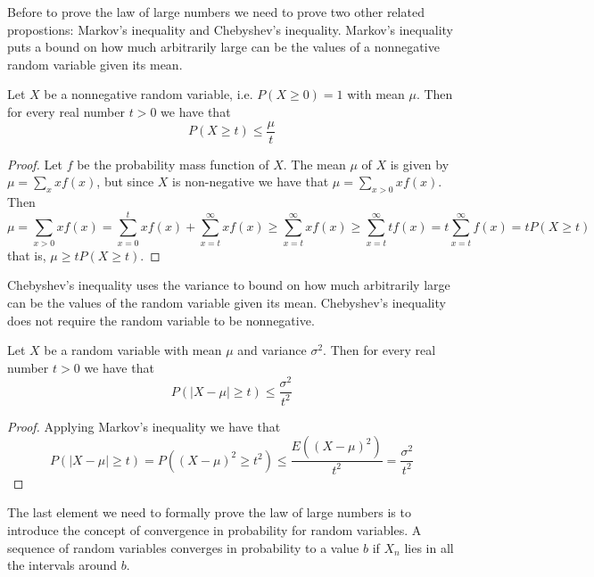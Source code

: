 Before to prove the law of large numbers we need to prove two other related propostions: Markov's inequality and Chebyshev's inequality. Markov's inequality puts a bound on how much arbitrarily large can be the values of a nonnegative random variable given its mean. 

\begin{proposition}
Let $X$ be a nonnegative random variable, i.e. $P\left( X \geq 0 \right) = 1$ with mean $\mu$. Then for every real number $t>0$ we have that 
\[
P \left( X \geq t \right) \leq \frac{\mu}{t}
\]
\end{proposition}
\begin{proof}
Let $f$ be the probability mass function of $X$. The mean $\mu$ of $X$ is given by $\mu = \sum_{x} x f \left( x \right)$, but since $X$ is non-negative we have that $\mu = \sum_{x>0} x f \left( x \right)$. Then
\[
\mu = \sum_{x>0} x f \left( x \right) = \sum_{x=0}^{t} x f \left( x \right) + \sum_{x=t}^{\infty} x f \left( x \right) \geq
\sum_{x=t}^{\infty} x f \left( x \right) \geq \sum_{x=t}^{\infty} t f \left( x \right) = t \sum_{x=t}^{\infty} f \left( x \right) =
t P \left( X \geq t \right)
\]
that is, $\mu \geq t P \left( X \geq t \right)$.
\end{proof}

Chebyshev's inequality uses the variance to bound on how much arbitrarily large can be the values of the random variable given its mean. Chebyshev's inequality does not require the random variable to be nonnegative.

\begin{corollary}
 Let $X$ be a random variable with mean $\mu$ and variance $\sigma^2$. Then for every real number $t > 0$ we have that
\[
P \left( \left| X - \mu \right| \geq t \right) \leq \frac{\sigma^2}{t^2}
\]
\end{corollary}
\begin{proof}
Applying Markov's inequality we have that
\[
P \left( \left| X - \mu \right| \geq t \right) = P \left( \left( X - \mu \right)^2 \geq t^2 \right) \leq \frac{E \left( \left( X - \mu \right)^2 \right)}{t^2} = \frac{\sigma^2}{t^2}
\]
\end{proof}

The last element we need to formally prove the law of large numbers is to introduce the concept of convergence in probability for random variables. A sequence of random variables converges in probability to a value $b$ if $X_n$ lies in all the intervals around $b$.

